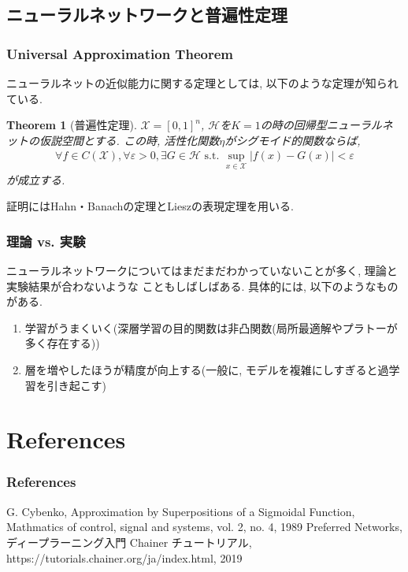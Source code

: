 \documentclass[dvipdfmx,11pt]{beamer}		%
\newtheorem{thm}[defi]{Theorem}
\newcommand{\X}{\mathcal{X}}
\newcommand{\Hil}{\mathcal{H}}
\begin{document}
    \subsection{ニューラルネットワークと普遍性定理}
    \begin{frame}
        \frametitle{Universal Approximation Theorem}
        ニューラルネットの近似能力に関する定理としては, 以下のような定理が知られている. 
        \begin{thm}[普遍性定理\cite{UAT}]
            $\X=[0, 1]^{n}$, $\Hil$を$K = 1$の時の回帰型ニューラルネットの仮説空間とする. 
            この時, 活性化関数$\eta$がシグモイド的関数ならば, 
            \begin{align*}
                \forall f\in C(\X), \forall\varepsilon> 0, \exists G\in\Hil\text{ s.t. } \sup_{x\in\X}|f(x) - G(x)| < \varepsilon
            \end{align*}
            が成立する. 
        \end{thm}
        証明にはHahn・Banachの定理とLieszの表現定理を用いる. 
    \end{frame}
    \begin{frame}
        \frametitle{理論 vs. 実験}
        ニューラルネットワークについてはまだまだわかっていないことが多く, 理論と実験結果が合わないような
        こともしばしばある. 具体的には, 以下のようなものがある.
            \begin{enumerate}
                \item 学習がうまくいく(深層学習の目的関数は非凸関数(局所最適解やプラトーが多く存在する))
                \item 層を増やしたほうが精度が向上する(一般に, モデルを複雑にしすぎると過学習を引き起こす)
            \end{enumerate}
    \end{frame}
    \section*{References}
    \begin{frame}\frametitle{References}
        \begin{thebibliography}{9}
            \beamertemplatetextbibitems
             G. Cybenko, Approximation by Superpositions of a Sigmoidal Function, 
                            Mathmatics of control, signal and systems, vol. 2, no. 4, 1989
		     Preferred Networks, ディープラーニング入門 Chainer チュートリアル,
            https://tutorials.chainer.org/ja/index.html, 2019
	    \end{thebibliography}
    \end{frame}
\end{document}

